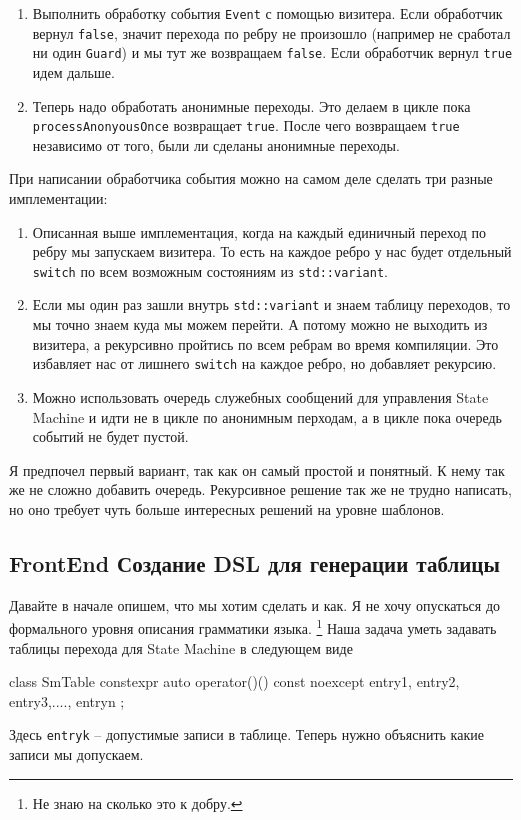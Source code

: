 \documentclass{article}
\begin{document}
{\begin{enumerate}
\item Выполнить обработку события \verb"Event" с помощью визитера.
Если обработчик вернул \verb"false", значит перехода по ребру не произошло (например не сработал ни один \verb"Guard") и мы тут же возвращаем \verb"false".
Если обработчик вернул \verb"true" идем дальше.

\item Теперь надо обработать анонимные переходы.
Это делаем в цикле пока \verb"processAnonyousOnce" возвращает \verb"true".
После чего возвращаем \verb"true" независимо от того, были ли сделаны анонимные переходы.
\end{enumerate}
При написании обработчика события можно на самом деле сделать три разные имплементации:
\begin{enumerate}
\item Описанная выше имплементация, когда на каждый единичный переход по ребру мы запускаем визитера.
То есть на каждое ребро у нас будет отдельный \verb"switch" по всем возможным состояниям из \verb"std::variant".

\item Если мы один раз зашли внутрь \verb"std::variant" и знаем таблицу переходов, то мы точно знаем куда мы можем перейти.
А потому можно не выходить из визитера, а рекурсивно пройтись по всем ребрам во время компиляции.
Это избавляет нас от лишнего \verb"switch" на каждое ребро, но добавляет рекурсию.

\item Можно использовать очередь служебных сообщений для управления State Machine и идти не в цикле по анонимным перходам, а в цикле пока очередь событий не будет пустой.
\end{enumerate}
Я предпочел первый вариант, так как он самый простой и понятный.
К нему так же не сложно добавить очередь.
Рекурсивное решение так же не трудно написать, но оно требует чуть больше интересных решений на уровне шаблонов.

\subsection{FrontEnd Создание DSL для генерации таблицы}

Давайте в начале опишем, что мы хотим сделать и как.
Я не хочу опускаться до формального уровня описания грамматики языка.%
\footnote{Не знаю на сколько это к добру.}
Наша задача уметь задавать таблицы перехода для State Machine в следующем виде
\begin{cppcode}
class SmTable {
  constexpr auto operator()() const noexcept {
    entry1, entry2, entry3,...., entryn
  }
};
\end{cppcode}
Здесь \verb"entryk" -- допустимые записи в таблице.
Теперь нужно объяснить какие записи мы допускаем.

}
\end{document}
